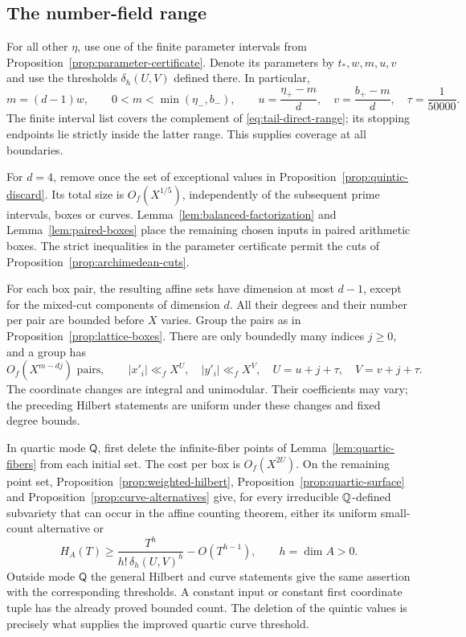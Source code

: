 \subsection{The number-field range}

For all other $\eta$, use one of the finite parameter intervals
from Proposition~\ref{prop:parameter-certificate}. Denote its
parameters by $t_*,w,m,u,v$ and use the thresholds
$\delta_h(U,V)$ defined there. In particular,
\[
 m=(d-1)w,\qquad 0<m<\min(\eta_-,b_-),\qquad
 u=\frac{\eta_+-m}{d},\quad
 v=\frac{b_+-m}{d},\quad \tau=\frac1{50000}.
\]
The finite interval list covers the complement of
\eqref{eq:tail-direct-range}; its stopping endpoints lie strictly
inside the latter range. This supplies coverage at all boundaries.

For $d=4$, remove once the set of exceptional values in
Proposition~\ref{prop:quintic-discard}. Its total size is
$O_f(X^{1/5})$, independently of the subsequent prime intervals,
boxes or curves. Lemma~\ref{lem:balanced-factorization} and
Lemma~\ref{lem:paired-boxes} place the remaining chosen inputs
in paired arithmetic boxes. The strict inequalities in the
parameter certificate permit the cuts of
Proposition~\ref{prop:archimedean-cuts}.

For each box pair, the resulting affine sets have dimension at
most $d-1$, except for the mixed-cut components of dimension $d$.
All their degrees and their number per pair are bounded before
$X$ varies. Group the pairs as in Proposition~\ref{prop:lattice-boxes}.
There are only boundedly many indices $j\ge0$, and a group has
\begin{equation}
 O_f(X^{m-dj})\text{ pairs},\qquad
 |x'_i|\ll_f X^U,\quad |y'_i|\ll_f X^V,
 \quad U=u+j+\tau,\quad V=v+j+\tau.
 \label{eq:tail-lattice-group}
\end{equation}
The coordinate changes are integral and unimodular. Their
coefficients may vary; the preceding Hilbert statements are
uniform under these changes and fixed degree bounds.

In quartic mode $\mathsf Q$, first delete the infinite-fiber
points of Lemma~\ref{lem:quartic-fibers} from each initial set.
The cost per box is $O_f(X^{2U})$. On the remaining point set,
Proposition~\ref{prop:weighted-hilbert},
Proposition~\ref{prop:quartic-surface} and
Proposition~\ref{prop:curve-alternatives} give, for every
irreducible $\mathbb Q$-defined subvariety that can occur in the affine
counting theorem, either its uniform small-count alternative or
\[
 H_A(T)\ge\frac{T^h}{h!\,\delta_h(U,V)^h}-O(T^{h-1}),
 \qquad h=\dim A>0.
\]
Outside mode $\mathsf Q$ the general Hilbert and curve statements
give the same assertion with the corresponding thresholds. A
constant input or constant first coordinate tuple has the already
proved bounded count. The deletion of the quintic values is
precisely what supplies the improved quartic curve threshold.

